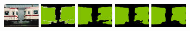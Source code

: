 \begin{figure}[h!]
	\centering
			 \\
			\includegraphics[width=0.16\textwidth]{image/appendix1/2007_000042.jpg}
			\includegraphics[width=0.16\textwidth]{image/appendix1/2007_000042.png}
			\includegraphics[width=0.16\textwidth]{image/appendix1/1/2007_000042.png} 
			\includegraphics[width=0.16\textwidth]{image/appendix1/3/2007_000042.png}
			\includegraphics[width=0.16\textwidth]{image/appendix1/5/2007_000042.png} \\
	

\end{figure}
